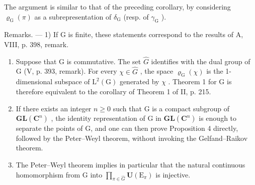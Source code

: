 The argument is similar to that of the preceding corollary, by considering \(\varrho_{\mathrm{G}}(\pi)\) as a subrepresentation of \(\delta_{\mathrm{G}}\) (resp. of \(\gamma_{\mathrm{G}}\) ).

Remarks. --- 1) If G is finite, these statements correspond to the results of A, VIII, p. 398, remark.

\begin{enumerate}
\def\labelenumi{\arabic{enumi})}
\setcounter{enumi}{1}
\item
  Suppose that G is commutative. The set \(\widehat{G}\) identifies with the dual group of G (V, p. 393, remark). For every \(\chi \in \widehat{G}\) , the space \(\varrho_{\mathrm{G}}(\chi)\) is the 1-dimensional subspace of \(\mathrm{L}^2 (\mathrm{G})\) generated by \(\chi\) . Theorem 1 for G is therefore equivalent to the corollary of Theorem 1 of II, p. 215.
\item
  If there exists an integer \(n \geqslant 0\) such that G is a compact subgroup of \(\mathbf{GL}(\mathbf{C}^{n})\) , the identity representation of G in \(\mathbf{GL}(\mathbf{C}^{n})\) is enough to separate the points of G, and one can then prove Proposition 4 directly, followed by the Peter–Weyl theorem, without invoking the Gelfand–Raikov theorem.
\item
  The Peter–Weyl theorem implies in particular that the natural continuous homomorphism from G into \(\prod_{\pi\in\widehat{G}}\mathbf{U}(\mathrm{E}_{\pi})\) is injective.
\end{enumerate}

